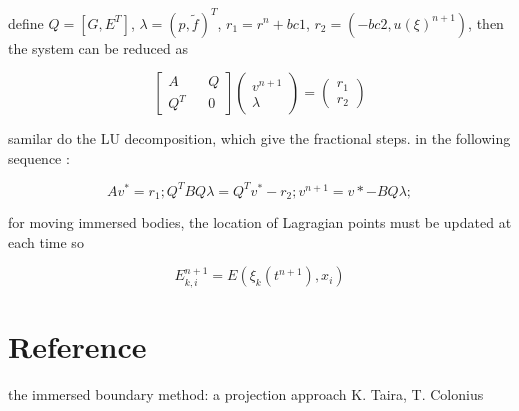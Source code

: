 \documentclass[11pt]{article}
\begin{document}
define $ Q = [G, E^T] $,  $\lambda = (p, \tilde{f})^T$, $ r_1 = r^n + bc1$,  $r_2=(-bc2, u(\xi)^{n+1}) $, then the system can be reduced as 

$$ 
\begin{bmatrix} A && Q \\ Q^T && 0  \end{bmatrix} \begin{pmatrix} v^{n+1} \\ \lambda \end{pmatrix} = \left( \begin{array}{c} r_1  \\ r_2 \end{array} \right)
$$
	
samilar do the LU decomposition, which give the fractional steps. in the following sequence :

\begin{equation}
	A v^* = r_1;
	Q^TBQ \lambda = Q^T v^* - r_2;
  	v^{n+1} = v* - BQ \lambda;
\end{equation}

for moving immersed bodies, the location of Lagragian points must be updated at each time so

$$ E_{k,i}^{n+1} = E (\xi _k(t^{n+1}), x_i) $$

\section {Reference}
the immersed boundary method: a projection approach  K. Taira, T. Colonius
\end{document}
